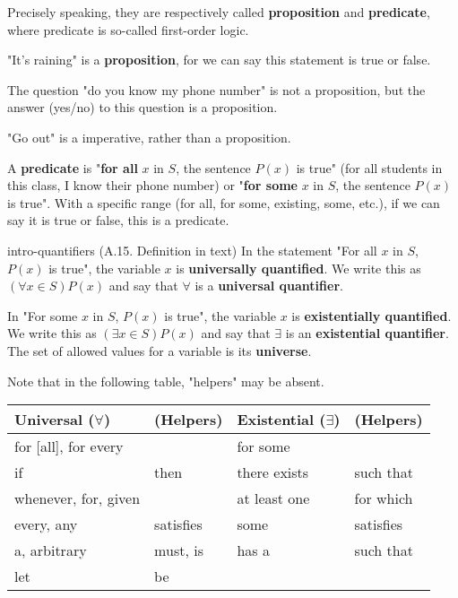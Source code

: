 \documentclass[../src/handouts/main.tex]{subfiles}
\begin{document}
Precisely speaking, they are respectively called \textbf{proposition} and \textbf{predicate}, where predicate is so-called first-order logic.

"It's raining" is a \textbf{proposition}, for we can say this statement is true or false.

The question "do you know my phone number" is not a proposition, but the answer (yes/no) to this question is a proposition.

"Go out" is a imperative, rather than a proposition.

A \textbf{predicate} is "\textbf{for all} $x$ in $S$, the sentence $P(x)$ is true" (for all students in this class, I know their phone number) or "\textbf{for some} $x$ in $S$, the sentence $P(x)$ is true". With a specific range (for all, for some, existing, some, etc.), if we can say it is true or false, this is a predicate.

\begin{definition}{}{intro-quantifiers}
  (A.15. Definition in text)
  In the statement "For all $x$ in $S$, $P(x)$ is true", the variable $x$ is \textbf{universally quantified}. We write this as $(\forall x \in S) P(x)$ and say that $\forall$ is a \textbf{universal quantifier}.

  In "For some $x$ in $S$, $P(x)$ is true", the variable $x$ is \textbf{existentially quantified}. We write this as $(\exists x \in S) P(x)$ and say that $\exists$ is an \textbf{existential quantifier}. The set of allowed values for a variable is its \textbf{universe}.

  Note that in the following table, "helpers" may be absent.

  \centering
  \begin{tabular}{ll|ll}
    Universal ($\forall$) & (Helpers) & Existential ($\exists$) & (Helpers) \\ \hline
    for [all], for every  &           & for some                &           \\
    if                    & then      & there exists            & such that \\
    whenever, for, given  &           & at least one            & for which \\
    every, any            & satisfies & some                    & satisfies \\
    a, arbitrary          & must, is  & has a                   & such that \\
    let                   & be        &                         &
  \end{tabular}
\end{definition}
\end{document}
